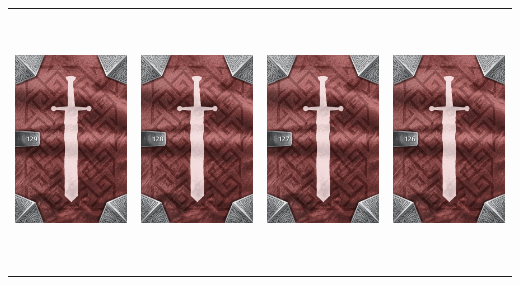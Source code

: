 \documentclass{minimal}
\begin{document}
{\begin{longtable}{llll}
\includegraphics[width=44mm,height=68mm]{./64-151/gh-129-black-card-back.png} &
\includegraphics[width=44mm,height=68mm]{./64-151/gh-128-black-censer-back.png} &
\includegraphics[width=44mm,height=68mm]{./64-151/gh-127-giant-remote-spider-back.png} &
\includegraphics[width=44mm,height=68mm]{./64-151/gh-126-remote-spider-back.png}\\ 

\end{longtable}}
\end{document}

